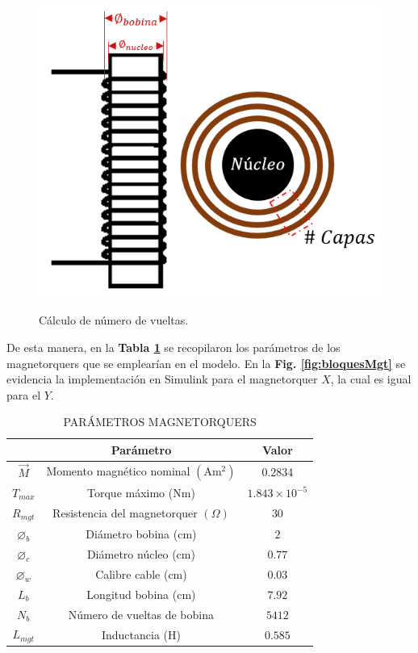 \begin{figure}[!ht]
	\begin{center}
		\includegraphics[scale=0.7]{imagenes/modelo_dinamico/dimensiones_mgt.png}\\
	\end{center}
	\caption{Cálculo de número de vueltas.}
	\label{fig:numVueltas}
\end{figure}

De esta manera, en la \textbf{Tabla \ref{table:Mgt}} se recopilaron los parámetros de los magnetorquers que se emplearían en el modelo. En la \textbf{Fig. \ref{fig:bloquesMgt}} se evidencia la implementación en Simulink para el magnetorquer $X$, la cual es igual para el $Y$. 
\newpage
\begin{table}[!ht]
	\caption{\MakeUppercase{Parámetros Magnetorquers }}
	\begin{center}
		\begin{tabular}{ c c c}
			
			&  \textbf{Parámetro} &  \textbf{Valor}\\ \hline
			$\vec{M}$ &  Momento magnético nominal $\mathrm{(Am^2)}$ & 0.2834\\ 
			$T_{max}$ &  Torque máximo (Nm) & $1.843\times10^{-5}$ \\ 
			$R_{mgt}$ &  Resistencia del magnetorquer $(\Omega)$& $30$ \\ 
			$\diameter_{b}$ &  Diámetro bobina (cm)& $2$ \\
			$\diameter_{c}$ &  Diámetro núcleo (cm)& $0.77$ \\
			$\diameter_{w}$ &  Calibre cable (cm)& $0.03$ \\  
			$L_{b}$ & Longitud bobina (cm) & $7.92$ \\
			$N_{b}$ & Número de vueltas de bobina  & $5412$ \\
			$L_{mgt}$ & Inductancia (H) & $0.585$ \\ \hline
			
		\end{tabular}
	\end{center}
	\label{table:Mgt}
\end{table}


